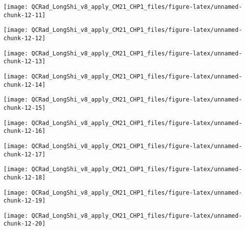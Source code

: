 \documentclass[
  10pt,
  a4paper,oneside]{article}
\begin{document}
\begin{center}\texttt{[image: QCRad\_LongShi\_v8\_apply\_CM21\_CHP1\_files/figure-latex/unnamed-chunk-12-11]} \end{center}

\begin{center}\texttt{[image: QCRad\_LongShi\_v8\_apply\_CM21\_CHP1\_files/figure-latex/unnamed-chunk-12-12]} \end{center}

\begin{center}\texttt{[image: QCRad\_LongShi\_v8\_apply\_CM21\_CHP1\_files/figure-latex/unnamed-chunk-12-13]} \end{center}

\begin{center}\texttt{[image: QCRad\_LongShi\_v8\_apply\_CM21\_CHP1\_files/figure-latex/unnamed-chunk-12-14]} \end{center}

\begin{center}\texttt{[image: QCRad\_LongShi\_v8\_apply\_CM21\_CHP1\_files/figure-latex/unnamed-chunk-12-15]} \end{center}

\begin{center}\texttt{[image: QCRad\_LongShi\_v8\_apply\_CM21\_CHP1\_files/figure-latex/unnamed-chunk-12-16]} \end{center}

\begin{center}\texttt{[image: QCRad\_LongShi\_v8\_apply\_CM21\_CHP1\_files/figure-latex/unnamed-chunk-12-17]} \end{center}

\begin{center}\texttt{[image: QCRad\_LongShi\_v8\_apply\_CM21\_CHP1\_files/figure-latex/unnamed-chunk-12-18]} \end{center}

\begin{center}\texttt{[image: QCRad\_LongShi\_v8\_apply\_CM21\_CHP1\_files/figure-latex/unnamed-chunk-12-19]} \end{center}

\begin{center}\texttt{[image: QCRad\_LongShi\_v8\_apply\_CM21\_CHP1\_files/figure-latex/unnamed-chunk-12-20]} \end{center}
\end{document}
